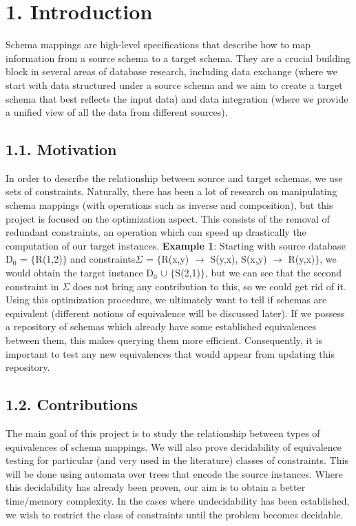 \documentclass[11pt, a4paper, dvipsnames]{article}
\begin{document}
\newpage

\setcounter{secnumdepth}{-1}
\setcounter{tocdepth}{2}
\tableofcontents

\newpage

\section{1. Introduction}
Schema mappings are high-level specifications that describe how to map information from a source schema to a target schema. They are a crucial building block in several areas of database research, including data exchange\cite{dataexchange} (where we start with data structured under a source schema and we aim to create a target schema that best reflects the input data) and data integration\cite{dataintegration} (where we provide a unified view of all the data from different sources).

\subsection{1.1. Motivation}
In order to describe the relationship between source and target schemas, we use sets of constraints. Naturally, there has been a lot of research on manipulating schema mappings (with operations such as inverse and composition), but this project is focused on the optimization aspect. This consists of the removal of redundant constraints, an operation which can speed up drastically the computation of our target instances. \newline
\textbf{Example 1}: Starting with source database D$_{0}$ = $\{$R(1,2)$\}$ and constraints\newline $\Sigma$ = $\{$R(x,y) $\rightarrow$ S(y,x), S(x,y) $\rightarrow$ R(y,x)$\}$, we would obtain the target instance D$_{0}$ $\cup$ $\{$S(2,1)$\}$, but we can see that the second constraint in $\Sigma$ does not bring any contribution to this, so we could get rid of it.\newline
Using this optimization procedure, we ultimately want to tell if schemas are equivalent (different notions of equivalence will be discussed later). If we possess a repository of schemas which already have some established equivalences between them, this makes querying them more efficient. Consequently, it is important to test any new equivalences that would appear from updating this repository. 

\subsection{1.2. Contributions}
The main goal of this project is to study the relationship between types of equivalences of schema mappings. We will also prove decidability of equivalence testing for particular (and very used in the literature) classes of constraints. This will be done using automata over trees that encode the source instances. Where this decidability has already been proven, our aim is to obtain a better time/memory complexity. In the cases where undecidability has been established, we wish to restrict the class of constraints until the problem becomes decidable. 
\end{document}
